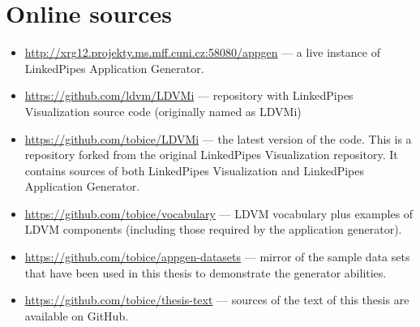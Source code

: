 \chapter{Online sources}
\label{att:online-sources}

\begin{itemize}
  \item \url{http://xrg12.projekty.ms.mff.cuni.cz:58080/appgen} --- a live \newline instance of LinkedPipes Application Generator.
  \item \url{https://github.com/ldvm/LDVMi} --- repository with LinkedPipes Visualization source code (originally named as LDVMi)
  \item \url{https://github.com/tobice/LDVMi} --- the latest version of the code. This is a repository forked from the original LinkedPipes Visualization repository. It contains sources of both LinkedPipes Visualization and LinkedPipes Application Generator.
  \item \url{https://github.com/tobice/vocabulary} --- LDVM vocabulary plus examples of LDVM components (including those required by the application generator).
  \item \url{https://github.com/tobice/appgen-datasets} --- mirror of the sample data sets that have been used in this thesis to demonstrate the generator abilities.
  \item \url{https://github.com/tobice/thesis-text} --- sources of the text of this thesis are available on GitHub.
\end{itemize}